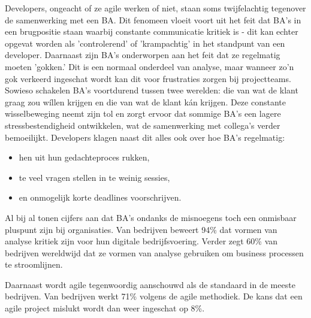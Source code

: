 \documentclass{hogent-article}
\begin{document}
Developers, ongeacht of ze agile werken of niet, staan soms twijfelachtig tegenover de 
samenwerking met een BA. Dit fenomeen vloeit voort uit het feit dat BA's in een brugpositie 
staan waarbij constante communicatie kritiek is - dit kan echter opgevat worden als 'controlerend'
of 'krampachtig' in het standpunt van een developer. Daarnaast zijn BA's onderworpen aan het 
feit dat ze regelmatig moeten 'gokken.' Dit is een normaal onderdeel van analyse, maar wanneer 
zo'n gok verkeerd ingeschat wordt kan dit voor frustraties zorgen bij projectteams. Sowieso 
schakelen BA's voortdurend tussen twee werelden: die van wat de klant graag zou wíllen 
krijgen en die van wat de klant kán krijgen. Deze constante wisselbeweging neemt zijn tol 
en zorgt ervoor dat sommige BA's een lagere stressbestendigheid ontwikkelen, wat de 
samenwerking met collega's verder bemoeilijkt. Developers klagen naast dit alles ook over 
hoe BA's regelmatig:
\begin{itemize}
  \item hen uit hun gedachteproces rukken,
  \item te veel vragen stellen in te weinig sessies,
  \item en onmogelijk korte deadlines voorschrijven.
\end{itemize}
\autocite{devba}

Al bij al tonen cijfers aan dat BA's ondanks de misnoegens toch een onmisbaar pluspunt zijn 
bij organisaties. Van bedrijven beweert 94\% dat vormen van analyse kritiek zijn voor hun
digitale bedrijfsvoering. Verder zegt 60\% van bedrijven wereldwijd dat ze vormen van 
analyse gebruiken om business processen te stroomlijnen. \autocite{stats}

Daarnaast wordt agile tegenwoordig aanschouwd als de standaard in de meeste bedrijven.
Van bedrijven werkt 71\% volgens de agile methodiek. De kans dat een agile project mislukt
wordt dan weer ingeschat op 8\%. \autocite{agilestats}
\end{document}
